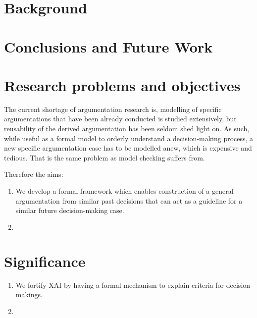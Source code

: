 \documentclass{llncs}%
\newcommand{\ryuta}[1]{{\color{magenta}{#1}}}
\begin{document}
\section{Background}\label{sec:bg}



\section{Conclusions and Future Work}\label{sec:conclusion}





\pagebreak 

\section*{Research problems and objectives} 
The current shortage of argumentation research \ryuta{correct me if this is not correct....} is, 
modelling of specific argumentations that have been already conducted is studied extensively, but reusability of the derived
argumentation has been seldom shed light on. As such, while useful as a formal model to orderly understand a decision-making process,  
a new specific argumentation case has to be modelled anew, which is expensive and tedious. That is the same problem 
as model checking suffers from. 

Therefore the aims: 
\begin{enumerate} 
	\item  We develop a formal framework which enables construction of a general argumentation from similar past decisions that 
		can act as a guideline for a similar future decision-making case. 
	\item 
\end{enumerate}

\section*{Significance} 
\begin{enumerate} 
	\item We fortify XAI by having a formal mechanism to explain criteria for decision-makings. 
	\item 
\end{enumerate}

\end{document}
